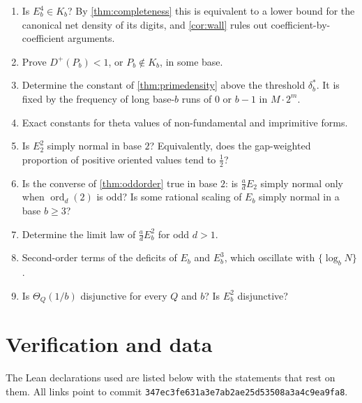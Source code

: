 \documentclass[11pt]{article}
\DeclareMathOperator{\ord}{ord}
\newcommand{\fr}[1]{\{#1\}}
\begin{document}
\begin{enumerate}[nosep]
\item Is $E_b^4\in K_b$? By \cref{thm:completeness} this is equivalent to a lower bound for the canonical
net density of its digits, and \cref{cor:wall} rules out coefficient-by-coefficient arguments.
\item Prove $D^+(P_b)<1$, or $P_b\notin K_b$, in some base.
\item Determine the constant of \cref{thm:primedensity} above the threshold $\delta_b^*$. It is fixed by
the frequency of long base-$b$ runs of $0$ or $b-1$ in $M\cdot2^m$.
\item Exact constants for theta values of non-fundamental and imprimitive forms.
\item Is $E_2^2$ simply normal in base $2$? Equivalently, does the gap-weighted proportion of positive
oriented values tend to $\frac12$?
\item Is the converse of \cref{thm:oddorder} true in base $2$: is $\frac adE_2$ simply normal only when
$\ord_d(2)$ is odd? Is some rational scaling of $E_b$ simply normal in a base $b\ge3$?
\item Determine the limit law of $\frac adE_b^2$ for odd $d>1$.
\item Second-order terms of the deficits of $E_b$ and $E_b^3$, which oscillate with $\fr{\log_bN}$.
\item Is $\Theta_Q(1/b)$ disjunctive for every $Q$ and $b$? Is $E_b^2$ disjunctive?
\end{enumerate}

\section{Verification and data}\label{sec:verification}

The Lean declarations used are listed below with the statements that rest on them. All links point
to commit \texttt{347ec3fe631a3e7ab2ae25d53508a3a4c9ea9fa8}.
\end{document}
